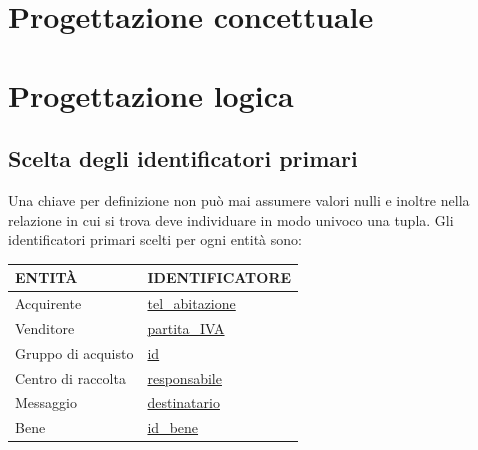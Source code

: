 \documentclass[a4paper, 10pt]{report}
\begin{document}
\chapter{Progettazione concettuale}

\chapter{Progettazione logica}

\section{Scelta degli identificatori primari}
Una chiave per definizione non pu\`o mai assumere valori nulli e inoltre nella relazione in cui si trova deve individuare in modo univoco una tupla. Gli identificatori primari scelti per ogni entit\`a sono:\\
\begin{table}[h!]
\centering
\begin{tabular}{|l|l|}
\hline
\textbf{ENTIT\`A}& \textbf{IDENTIFICATORE}\\
\hline
Acquirente & \underline{tel\_abitazione}\\
\hline
Venditore & \underline{partita\_IVA}\\
\hline
Gruppo di acquisto & \underline{id}\\
\hline
Centro di raccolta & \underline{responsabile}\\
\hline
Messaggio & \underline{destinatario}\\
\hline
Bene & \underline{id\_bene} \\
\hline
\end{tabular}
\end{table}
\end{document}
